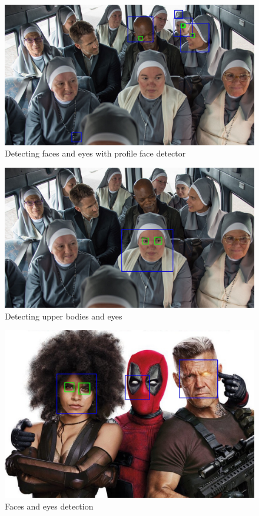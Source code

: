 \documentclass{article}
\begin{document}
\begin{figure}
\center
            \includegraphics[width=1\textwidth]{hbp}
\caption{Detecting faces and eyes with profile face detector}
\end{figure}       
\begin{figure}
\center
            \includegraphics[width=1\textwidth]{hbub}
\caption{Detecting upper bodies and eyes}
\end{figure}  
\begin{figure}
\center
            \includegraphics[width=1\textwidth]{dpfacesmile}
\caption{Faces and eyes detection}
\end{figure}       
\end{document}
